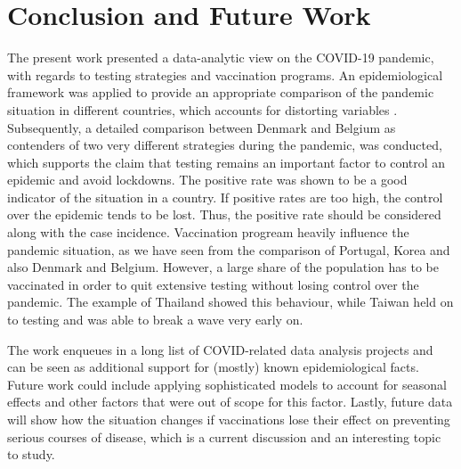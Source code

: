 \documentclass[a4paper,11pt]{article}
\begin{document}
\section{Conclusion and Future Work}

The present work presented a data-analytic view on the COVID-19 pandemic, with regards to testing strategies and vaccination programs. An epidemiological framework was applied to provide an appropriate comparison of the pandemic situation in different countries, which accounts for distorting variables \cite{middelburg2020covid}. Subsequently, a detailed comparison between Denmark and Belgium as contenders of two very different strategies during the pandemic, was conducted, which supports the claim that testing remains an important factor to control an epidemic and avoid lockdowns. The positive rate was shown to be a good indicator of the situation in a country. If positive rates are too high, the control over the epidemic tends to be lost. Thus, the positive rate should be considered along with the case incidence. Vaccination progream heavily influence the pandemic situation, as we have seen from the comparison of Portugal, Korea and also Denmark and Belgium. However, a large share of the population has to be vaccinated in order to quit extensive testing without losing control over the pandemic. The example of Thailand showed this behaviour, while Taiwan held on to testing and was able to break a wave very early on.

The work enqueues in a long list of COVID-related data analysis projects and can be seen as additional support for (mostly) known epidemiological facts. Future work could include applying sophisticated models to account for seasonal effects and other factors that were out of scope for this factor. Lastly, future data will show how the situation changes if vaccinations lose their effect on preventing serious courses of disease, which is a current discussion and an interesting topic to study.

\newpage

\printbibliography
\end{document}
